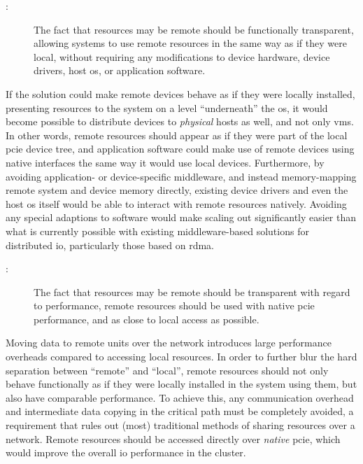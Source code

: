 \begin{description}
    \item[:] The fact that resources may be remote should be functionally transparent, allowing systems to use remote resources in the same way as if they were local, without requiring any modifications to device hardware, device drivers, host \gls{os}, or application software.
\end{description}
If the solution could make remote devices behave as if they were locally installed, presenting resources to the system on a level ``underneath'' the \gls{os}, it would become possible to distribute devices to \emph{physical} hosts as well, and not only \glspl{vm}. 
In other words, remote resources should appear as if they were part of the local \gls{pcie} device tree, and application software could make use of remote devices using native interfaces the same way it would use local devices.
%
Furthermore, by avoiding application- or device-specific middleware, and instead memory-mapping remote system and device memory directly, existing device drivers and even the host \gls{os} itself would be able to interact with remote resources natively.
Avoiding any special adaptions to software would make scaling out significantly easier than what is currently possible with existing middleware-based solutions for distributed \gls{io}, particularly those based on \gls{rdma}.

\begin{description}    
    \item[:] The fact that resources may be remote should be transparent with regard to performance, remote resources should be used with native \gls{pcie} performance, and as close to local access as possible.
\end{description}
Moving data to remote units over the network introduces large performance overheads compared to accessing local resources. 
In order to further blur the hard separation between ``remote'' and ``local'', remote resources should not only behave functionally as if they were locally installed in the system using them, but also have comparable performance.
To achieve this, any communication overhead and intermediate data copying in the critical path must be completely avoided, a requirement that rules out (most) traditional methods of sharing resources over a network. 
Remote resources should be accessed directly over \emph{native} \gls{pcie}, which would improve the overall \gls{io} performance in the cluster.


